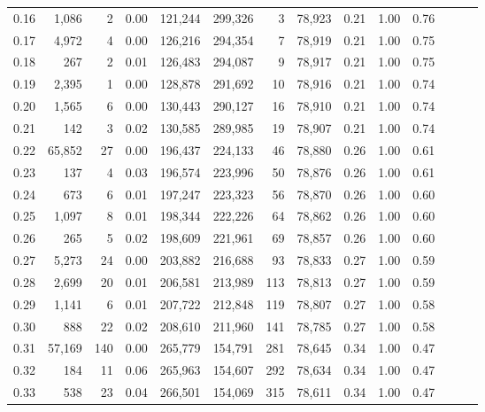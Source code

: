 \begin{tabular}{rrrrrrrrrrrrrr}
0.16 &   1,086 &       2 &  0.00 &  121,244 &  299,326 &       3 &  78,923 &  0.21 &  1.00 &      0.76 \\
0.17 &   4,972 &       4 &  0.00 &  126,216 &  294,354 &       7 &  78,919 &  0.21 &  1.00 &      0.75 \\
0.18 &     267 &       2 &  0.01 &  126,483 &  294,087 &       9 &  78,917 &  0.21 &  1.00 &      0.75 \\
0.19 &   2,395 &       1 &  0.00 &  128,878 &  291,692 &      10 &  78,916 &  0.21 &  1.00 &      0.74 \\
0.20 &   1,565 &       6 &  0.00 &  130,443 &  290,127 &      16 &  78,910 &  0.21 &  1.00 &      0.74 \\
0.21 &     142 &       3 &  0.02 &  130,585 &  289,985 &      19 &  78,907 &  0.21 &  1.00 &      0.74 \\
0.22 &  65,852 &      27 &  0.00 &  196,437 &  224,133 &      46 &  78,880 &  0.26 &  1.00 &      0.61 \\
0.23 &     137 &       4 &  0.03 &  196,574 &  223,996 &      50 &  78,876 &  0.26 &  1.00 &      0.61 \\
0.24 &     673 &       6 &  0.01 &  197,247 &  223,323 &      56 &  78,870 &  0.26 &  1.00 &      0.60 \\
0.25 &   1,097 &       8 &  0.01 &  198,344 &  222,226 &      64 &  78,862 &  0.26 &  1.00 &      0.60 \\
0.26 &     265 &       5 &  0.02 &  198,609 &  221,961 &      69 &  78,857 &  0.26 &  1.00 &      0.60 \\
0.27 &   5,273 &      24 &  0.00 &  203,882 &  216,688 &      93 &  78,833 &  0.27 &  1.00 &      0.59 \\
0.28 &   2,699 &      20 &  0.01 &  206,581 &  213,989 &     113 &  78,813 &  0.27 &  1.00 &      0.59 \\
0.29 &   1,141 &       6 &  0.01 &  207,722 &  212,848 &     119 &  78,807 &  0.27 &  1.00 &      0.58 \\
0.30 &     888 &      22 &  0.02 &  208,610 &  211,960 &     141 &  78,785 &  0.27 &  1.00 &      0.58 \\
0.31 &  57,169 &     140 &  0.00 &  265,779 &  154,791 &     281 &  78,645 &  0.34 &  1.00 &      0.47 \\
0.32 &     184 &      11 &  0.06 &  265,963 &  154,607 &     292 &  78,634 &  0.34 &  1.00 &      0.47 \\
0.33 &     538 &      23 &  0.04 &  266,501 &  154,069 &     315 &  78,611 &  0.34 &  1.00 &      0.47 \\

\end{tabular}
